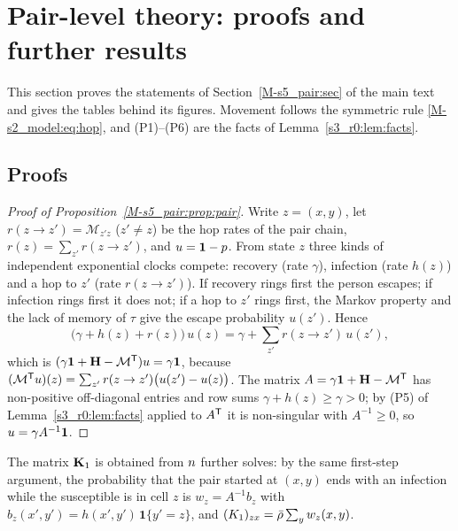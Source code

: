\section{Pair-level theory: proofs and further results}\label{appS_pair:sec}

This section proves the statements of Section~\ref{M-s5_pair:sec} of the main text and gives the tables behind its
figures. Movement follows the symmetric rule \eqref{M-s2_model:eq:hop}, and (P1)--(P6) are the facts of
Lemma~\ref{s3_r0:lem:facts}.

\subsection{Proofs}

\begin{proof}[Proof of Proposition~\ref{M-s5_pair:prop:pair}]
Write $z=(x,y)$, let $r(z\to z')=\mathcal{M}_{z'z}$ ($z'\ne z$) be the hop rates of the pair chain,
$r(z)=\sum_{z'}r(z\to z')$, and $u=\boldsymbol{1}-p$. From state $z$ three kinds of independent exponential clocks
compete: recovery (rate $\gamma$), infection (rate $h(z)$) and a hop to $z'$ (rate $r(z\to z')$). If recovery
rings first the person escapes; if infection rings first it does not; if a hop to $z'$ rings first, the
Markov property and the lack of memory of $\tau$ give the escape probability $u(z')$. Hence
\[
  \bigl(\gamma+h(z)+r(z)\bigr)\,u(z)=\gamma+\sum_{z'}r(z\to z')\,u(z') ,
\]
which is $(\gamma\mathbf{1}+\mathbf{H}-\mathcal{M}^{\mathsf{T}})u=\gamma\boldsymbol{1}$, because
$(\mathcal{M}^{\mathsf{T}}u)(z)=\sum_{z'}r(z\to z')\bigl(u(z')-u(z)\bigr)$. The matrix
$A=\gamma\mathbf{1}+\mathbf{H}-\mathcal{M}^{\mathsf{T}}$ has non-positive off-diagonal entries and row sums
$\gamma+h(z)\ge\gamma>0$; by (P5) of Lemma~\ref{s3_r0:lem:facts} applied to $A^{\mathsf{T}}$ it is non-singular with
$A^{-1}\ge0$, so $u=\gamma A^{-1}\boldsymbol{1}$.
\end{proof}

The matrix $\mathbf{K}_1$ is obtained from $n$ further
solves: by the same first-step argument, the probability that the pair started at $(x,y)$ ends with an
infection while the susceptible is in cell $z$ is $w_z=A^{-1}b_z$ with $b_z(x',y')=h(x',y')\,\mathbf{1}\{y'=z\}$,
and $(K_1)_{zx}=\bar{\rho}\sum_yw_z(x,y)$.

